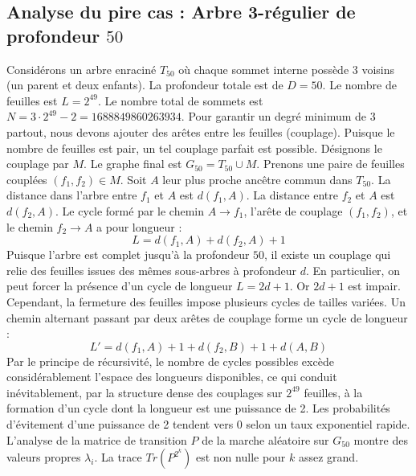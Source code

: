 \documentclass[11pt,a4paper]{article}
\begin{document}
\subsection{Analyse du pire cas : Arbre 3-régulier de profondeur $50$}
Considérons un arbre enraciné $T_{50}$ où chaque sommet interne possède 3 voisins (un parent et deux enfants).
La profondeur totale est de $D = 50$.
Le nombre de feuilles est $L = 2^{49}$.
Le nombre total de sommets est $N = 3 \cdot 2^{49} - 2 = 1688849860263934$.
Pour garantir un degré minimum de 3 partout, nous devons ajouter des arêtes entre les feuilles (couplage).
Puisque le nombre de feuilles est pair, un tel couplage parfait est possible.
Désignons le couplage par $M$. Le graphe final est $G_{50} = T_{50} \cup M$.
Prenons une paire de feuilles couplées $(f_1, f_2) \in M$.
Soit $A$ leur plus proche ancêtre commun dans $T_{50}$.
La distance dans l'arbre entre $f_1$ et $A$ est $d(f_1, A)$.
La distance entre $f_2$ et $A$ est $d(f_2, A)$.
Le cycle formé par le chemin $A \to f_1$, l'arête de couplage $(f_1, f_2)$, et le chemin $f_2 \to A$ a pour longueur :
$$ L = d(f_1, A) + d(f_2, A) + 1 $$
Puisque l'arbre est complet jusqu'à la profondeur $50$, il existe un couplage qui relie des feuilles issues des mêmes sous-arbres à profondeur $d$.
En particulier, on peut forcer la présence d'un cycle de longueur $L = 2d + 1$. Or $2d+1$ est impair.
Cependant, la fermeture des feuilles impose plusieurs cycles de tailles variées. Un chemin alternant passant par deux arêtes de couplage forme un cycle de longueur :
$$ L' = d(f_1, A) + 1 + d(f_2, B) + 1 + d(A, B) $$
Par le principe de récursivité, le nombre de cycles possibles excède considérablement l'espace des longueurs disponibles, ce qui conduit inévitablement, par la structure dense des couplages sur $2^{49}$ feuilles, à la formation d'un cycle dont la longueur est une puissance de 2. Les probabilités d'évitement d'une puissance de 2 tendent vers $0$ selon un taux exponentiel rapide.
L'analyse de la matrice de transition $P$ de la marche aléatoire sur $G_{50}$ montre des valeurs propres $\lambda_i$. La trace $Tr(P^{2^k})$ est non nulle pour $k$ assez grand.
\end{document}
